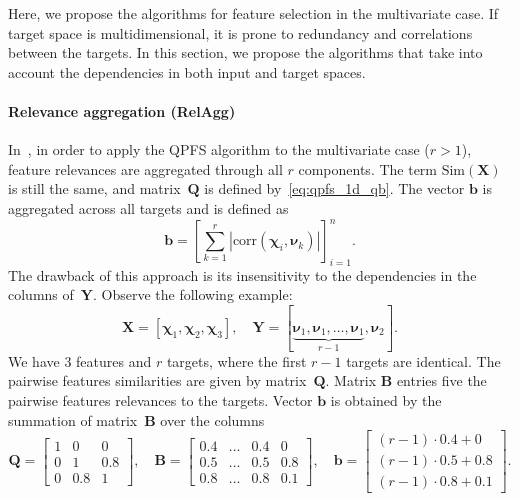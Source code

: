 \documentclass[preprint,authoryear,12pt]{elsarticle}
\theoremstyle{definition}
\newcommand{\bb}{\mathbf{b}}
\newcommand{\bY}{\mathbf{Y}}
\newcommand{\bX}{\mathbf{X}}
\newcommand{\bB}{\mathbf{B}}
\newcommand{\bQ}{\mathbf{Q}}
\newcommand{\bchi}{\boldsymbol{\chi}}
\newcommand{\bnu}{\boldsymbol{\nu}}
\begin{document}
Here, we propose the algorithms for feature selection in the multivariate case. 
If target space is multidimensional, it is prone to redundancy and correlations between the targets. 
In this section, we propose the algorithms that take into account the dependencies in both input and target spaces.

\paragraph{Relevance aggregation (RelAgg)}

In~\citep{motrenko2018multi}, in order to apply the QPFS algorithm to the multivariate case ($r > 1$), feature relevances are aggregated through all $r$ components. The term $\text{Sim}(\bX)$ is still the same, and matrix~$\bQ$ is defined by~\eqref{eq:qpfs_1d_qb}. The vector $\bb$ is aggregated across all targets and is defined as
\begin{equation*}
\bb = \left[\sum_{k=1}^r|\text{corr}(\bchi_i, \bnu_k)|\right]_{i=1}^n.
\end{equation*}
The drawback of this approach is its insensitivity to the dependencies in the columns of~$\bY$. Observe the following example:
\begin{equation*}
\bX = [\bchi_1, \bchi_2, \bchi_3], \quad \bY = [\underbrace{\bnu_1, \bnu_1, \dots, \bnu_1}_{r-1}, \bnu_2].
\end{equation*}
We have 3 features and $r$ targets, where the first $r-1$ targets are identical.
The pairwise features similarities are given by matrix~$\bQ$.
Matrix $\bB$ entries five the pairwise features relevances to the targets.
Vector $\bb$ is obtained by the summation of matrix~$\bB$ over the columns
\begin{equation}
\bQ = \begin{bmatrix} 1 & 0 & 0\\ 0 & 1 & 0.8 \\ 0 & 0.8 & 1 \end{bmatrix}, \quad
\bB = \begin{bmatrix} 0.4 & \dots & 0.4 & 0 \\ 0.5 & \dots & 0.5 & 0.8 \\ 0.8 & \dots & 0.8 & 0.1 \end{bmatrix}, \quad
\bb = \begin{bmatrix} (r-1) \cdot 0.4 + 0 \\ (r-1) \cdot 0.5 + 0.8 \\ (r-1) \cdot 0.8 + 0.1 \end{bmatrix}.
\label{eq:qpfs_example}
\end{equation}
\end{document}
